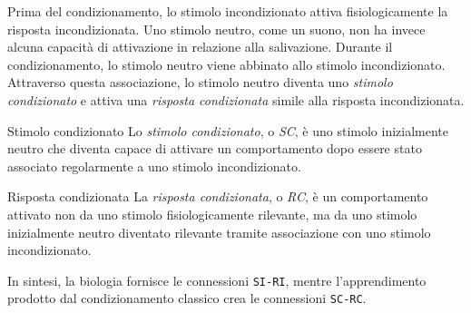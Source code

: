 \documentclass[a4paper]{article}
\begin{document}
Prima del condizionamento, lo stimolo incondizionato attiva fisiologicamente la risposta incondizionata. Uno stimolo neutro, come un suono, non ha invece alcuna capacità di attivazione in relazione alla salivazione.
Durante il condizionamento, lo stimolo neutro viene abbinato allo stimolo incondizionato. Attraverso questa associazione, lo stimolo neutro diventa uno \emph{stimolo condizionato} e attiva una \emph{risposta condizionata} simile alla risposta incondizionata.
\begin{snippetdefinition}{Stimolo condizionato}
    Lo \emph{stimolo condizionato}, o \emph{SC}, è uno stimolo inizialmente neutro che diventa capace di attivare un comportamento dopo essere stato associato regolarmente a uno stimolo incondizionato.
\end{snippetdefinition}
\begin{snippetdefinition}{Risposta condizionata}
    La \emph{risposta condizionata}, o \emph{RC}, è un comportamento attivato non da uno stimolo fisiologicamente rilevante, ma da uno stimolo inizialmente neutro diventato rilevante tramite associazione con uno stimolo incondizionato.
\end{snippetdefinition}
In sintesi, la biologia fornisce le connessioni \texttt{SI-RI}, mentre l'apprendimento prodotto dal condizionamento classico crea le connessioni \texttt{SC-RC}.
\end{document}
